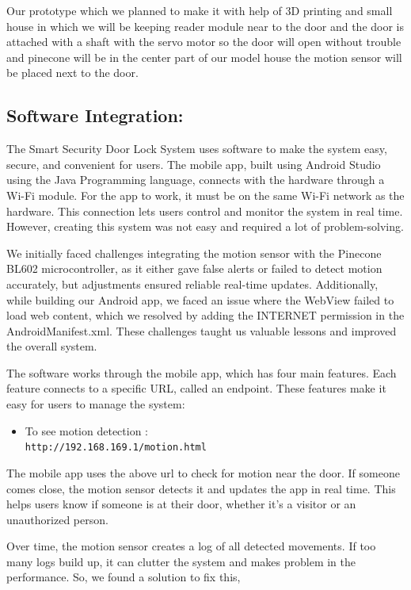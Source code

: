 \documentclass[USenglish,oneside,twocolumn]{article}
\begin{document}
Our prototype which we planned to make it with help of 3D printing and small house in which we will be keeping reader module near to the door and the door is attached with a shaft with the servo motor so the door will open without trouble and pinecone will be in the center part of our model house the motion sensor will be placed next to the door. 


\subsection{Software Integration:}The Smart Security Door Lock System uses software to make the system easy, secure, and convenient for users. The mobile app, built using Android Studio using the Java Programming language, connects with the hardware through a Wi-Fi module. For the app to work, it must be on the same Wi-Fi network as the hardware. This connection lets users control and monitor the system in real time. However, creating this system was not easy and required a lot of problem-solving.

We initially faced challenges integrating the motion sensor with the Pinecone BL602 microcontroller, as it either gave false alerts or failed to detect motion accurately, but adjustments ensured reliable real-time updates. Additionally, while building our Android app, we faced an issue where the WebView failed to load web content, which we resolved by adding the INTERNET permission in the AndroidManifest.xml. These challenges taught us valuable lessons and improved the overall system.

The software works through the mobile app, which has four main features. Each feature connects to a specific URL, called an endpoint. These features make it easy for users to manage the system:

\begin{itemize}
    \item To  see motion detection :\\
    \texttt{http://192.168.169.1/motion.html}
\end{itemize}

The mobile  app uses the above url to check for motion near the door. If someone comes close, the motion sensor detects it and updates the app in real time. This helps users know if someone is at their door, whether it’s a visitor or an unauthorized person.

Over time, the motion sensor creates a log of all detected movements. If too many logs build up, it can clutter the system and makes problem in the performance. So, we found a solution to fix this, 
\end{document}
